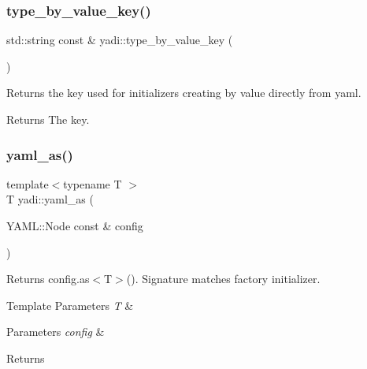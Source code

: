 \subsubsection{\texorpdfstring{type\+\_\+by\+\_\+value\+\_\+key()}{type\_by\_value\_key()}}
{\footnotesize\ttfamily std\+::string const  \& yadi\+::type\+\_\+by\+\_\+value\+\_\+key (\begin{DoxyParamCaption}{ }\end{DoxyParamCaption})}



Returns the key used for initializers creating by value directly from yaml. 

\begin{DoxyReturn}{Returns}
The key. 
\end{DoxyReturn}
\mbox{\label{namespaceyadi_a8552ed4e9350993901558fb0db1e0906}} 
\subsubsection{\texorpdfstring{yaml\+\_\+as()}{yaml\_as()}}
{\footnotesize\ttfamily template$<$typename T $>$ \\
T yadi\+::yaml\+\_\+as (\begin{DoxyParamCaption}\item[{Y\+A\+M\+L\+::\+Node const \&}]{config }\end{DoxyParamCaption})}



Returns config.\+as$<$\+T$>$(). Signature matches factory initializer. 


\begin{DoxyTemplParams}{Template Parameters}
{\em T} & \\
\hline
\end{DoxyTemplParams}

\begin{DoxyParams}{Parameters}
{\em config} & \\
\hline
\end{DoxyParams}
\begin{DoxyReturn}{Returns}

\end{DoxyReturn}
